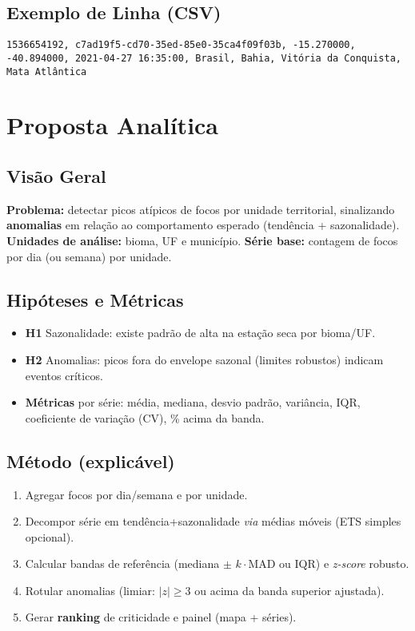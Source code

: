 \documentclass[12pt,a4paper]{report}
\begin{document}
\section{Exemplo de Linha (CSV)}
\begin{lstlisting}
1536654192, c7ad19f5-cd70-35ed-85e0-35ca4f09f03b, -15.270000, -40.894000, 2021-04-27 16:35:00, Brasil, Bahia, Vitória da Conquista, Mata Atlântica
\end{lstlisting}

\chapter{Proposta Analítica}

\section{Visão Geral}
\textbf{Problema:} detectar picos atípicos de focos por unidade territorial, sinalizando \textbf{anomalias} em relação ao comportamento esperado (tendência + sazonalidade).  
\textbf{Unidades de análise:} bioma, UF e município.  
\textbf{Série base:} contagem de focos por dia (ou semana) por unidade.

\section{Hipóteses e Métricas}
\begin{itemize}
  \item \textbf{H1} Sazonalidade: existe padrão de alta na estação seca por bioma/UF.
  \item \textbf{H2} Anomalias: picos fora do envelope sazonal (limites robustos) indicam eventos críticos.
  \item \textbf{Métricas} por série: média, mediana, desvio padrão, variância, IQR, coeficiente de variação (CV), \% acima da banda.
\end{itemize}

\section{Método (explicável)}
\begin{enumerate}
  \item Agregar focos por dia/semana e por unidade.
  \item Decompor série em tendência+sazonalidade \emph{via} médias móveis (ETS simples opcional).
  \item Calcular bandas de referência (mediana $\pm$ $k\cdot\mathrm{MAD}$ ou IQR) e \textit{z-score} robusto.
  \item Rotular anomalias (limiar: $|z|\ge 3$ ou acima da banda superior ajustada).
  \item Gerar \textbf{ranking} de criticidade e painel (mapa + séries).
\end{enumerate}
\end{document}
